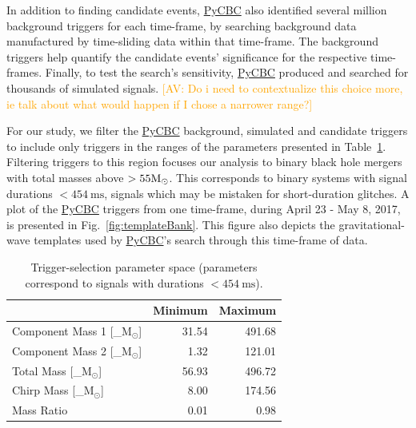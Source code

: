 \documentclass[%
 nofootinbib,
 amsmath,amssymb,
 aps,
 twocolumn,
 superscriptaddress
]{revtex4-2}
\newcommand{\pycbc}{{\sc \href{https://pycbc.org/}{{PyCBC}}}\xspace}
\newcommand{\mathcmd}[1]{{\sc \relax\ifmmode#1\else $#1$\fi}\xspace}
\newcommand{\msun}{\mathcmd{\text{M}_\odot}}
\newcommand{\avi}[1]{\textcolor{orange}{[AV: #1]}}
\begin{document}
In addition to finding candidate events, \pycbc also identified several million background triggers for each time-frame, by searching background data manufactured by time-sliding data within that time-frame. The background triggers help quantify the candidate events' significance for the respective time-frames. Finally, to test the search's sensitivity, \pycbc produced and searched for thousands of simulated signals. \avi{Do i need to contextualize this choice more, ie talk about what would happen if I chose a narrower range?}

For our study, we filter the \pycbc background, simulated and candidate triggers to include only triggers in the ranges of the parameters presented in Table~\ref{tab:parameters}. Filtering triggers to this region focuses our analysis to binary black hole mergers with total masses above $> 55 \msun$. This corresponds to binary systems with signal durations $<454 \ \text{ms}$, signals which may be mistaken for short-duration glitches. A plot of the \pycbc triggers from one time-frame, during April 23 - May 8, 2017, is presented in Fig.~\ref{fig:templateBank}. This figure also depicts the gravitational-wave templates used by \pycbc's search through this time-frame of data. 

\begin{table}[t]

\caption[BBH parameters correspond to duration $<454\ \text{ms}$]{\label{tab:parameters}Trigger-selection parameter space (parameters correspond to signals with durations $<454 \ \text{ms}$). }
\centering
\begin{tabular}{lrr}
\toprule
  & Minimum & Maximum\\
\midrule
Component Mass 1 [\msun] & 31.54 & 491.68\\
Component Mass 2 [\msun] & 1.32 & 121.01\\
Total Mass [\msun] & 56.93 & 496.72\\
Chirp Mass [\msun] & 8.00 & 174.56\\
Mass Ratio & 0.01 & 0.98\\
\end{tabular}
\end{table}
\end{document}
